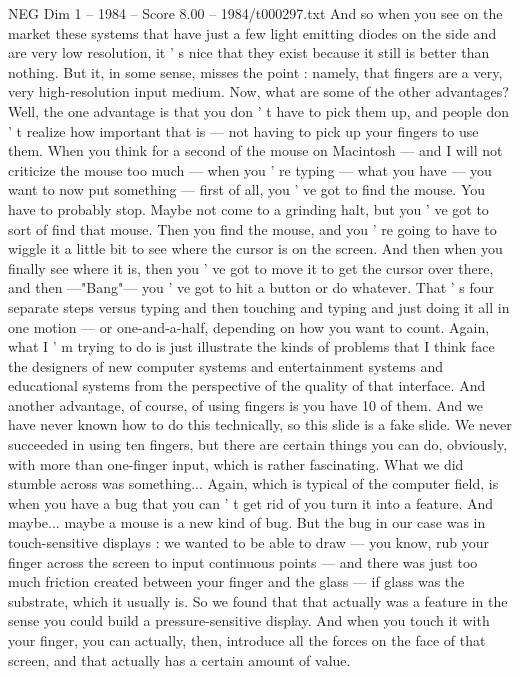 \begin{textsample}{NEG Dim 1 – 1984 – Score 8.00 – 1984/t000297.txt}
And so when you see on the market these systems that have just a few light emitting diodes on the side and are very low resolution, it ' s nice that they exist because it still is better than nothing.
But it, in some sense, misses the point : namely, that fingers are a very, very high-resolution input medium.
Now, what are some of the other advantages?
Well, the one advantage is that you don ' t have to pick them up, and people don ' t realize how important that is — not having to pick up your fingers to use them.
When you think for a second of the mouse on Macintosh — and I will not criticize the mouse too much — when you ' re typing — what you have — you want to now put something — first of all, you ' ve got to find the mouse.
You have to probably stop.
Maybe not come to a grinding halt, but you ' ve got to sort of find that mouse.
Then you find the mouse, and you ' re going to have to wiggle it a little bit to see where the cursor is on the screen.
And then when you finally see where it is, then you ' ve got to move it to get the cursor over there, and then —"Bang"— you ' ve got to hit a button or do whatever.
That ' s four separate steps versus typing and then touching and typing and just doing it all in one motion — or one-and-a-half, depending on how you want to count.
Again, what I ' m trying to do is just illustrate the kinds of problems that I think face the designers of new computer systems and entertainment systems and educational systems from the perspective of the quality of that interface.
And another advantage, of course, of using fingers is you have 10 of them.
And we have never known how to do this technically, so this slide is a fake slide.
We never succeeded in using ten fingers, but there are certain things you can do, obviously, with more than one-finger input, which is rather fascinating.
What we did stumble across was something...
Again, which is typical of the computer field, is when you have a bug that you can ' t get rid of you turn it into a feature.
And maybe... maybe a mouse is a new kind of bug.
But the bug in our case was in touch-sensitive displays : we wanted to be able to draw — you know, rub your finger across the screen to input continuous points — and there was just too much friction created between your finger and the glass — if glass was the substrate, which it usually is.
So we found that that actually was a feature in the sense you could build a pressure-sensitive display.
And when you touch it with your finger, you can actually, then, introduce all the forces on the face of that screen, and that actually has a certain amount of value.

\end{textsample}
